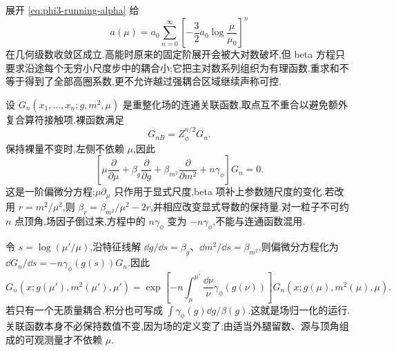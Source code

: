 展开 \eqref{eq:phi3-running-alpha} 给
\begin{equation}
 a(\mu)=a_0\sum_{n=0}^\infty
       \left[-\frac32a_0\log\frac\mu{\mu_0}\right]^n
\end{equation}
在几何级数收敛区成立.高能时原来的固定阶展开会被大对数破坏,但 beta 方程只要求沿途每个无穷小尺度步中的耦合小;它把主对数系列组织为有理函数.重求和不等于得到了全部高圈系数,更不允许越过强耦合区域继续声称可控.


设 $G_n(x_1,\ldots,x_n;g,m^2,\mu)$ 是重整化场的连通关联函数,取点互不重合以避免额外复合算符接触项.裸函数满足
\begin{equation}
 G_{nB}=Z_\phi^{n/2}G_n.
\end{equation}
保持裸量不变时,左侧不依赖 $\mu$,因此
\begin{equation}
 \left[\mu\frac\partial{\partial\mu}
       +\beta_g\frac\partial{\partial g}
       +\beta_{m^2}\frac\partial{\partial m^2}
       +n\gamma_\phi\right]G_n=0.
 \label{eq:callan-symanzik-connected}
\end{equation}
这是一阶偏微分方程;$\mu\partial_\mu$ 只作用于显式尺度,beta 项补上参数随尺度的变化.若改用 $r=m^2/\mu^2$,则 $\beta_r=\beta_{m^2}/\mu^2-2r$,并相应改变显式导数的保持量.对一粒子不可约 $n$ 点顶角,场因子倒过来,方程中的 $n\gamma_\phi$ 变为 $-n\gamma_\phi$,不能与连通函数混用.

令 $s=\log(\mu'/\mu)$,沿特征线解
$\dd g/\dd s=\beta_g$、$\dd m^2/\dd s=\beta_{m^2}$,则偏微分方程化为
$\dd G_n/\dd s=-n\gamma_\phi(g(s))G_n$.因此
\begin{equation}
 G_n(x;g(\mu'),m^2(\mu'),\mu')
 =\exp\left[-n\int_\mu^{\mu'}\frac{\dd\nu}\nu
                   \gamma_\phi(g(\nu))\right]
 G_n(x;g(\mu),m^2(\mu),\mu).
 \label{eq:cs-characteristic-solution}
\end{equation}
若只有一个无质量耦合,积分也可写成 $\int\gamma_\phi(g)\dd g/\beta(g)$.这就是场归一化的运行.关联函数本身不必保持数值不变,因为场的定义变了;由适当外腿留数、源与顶角组成的可观测量才不依赖 $\mu$.

